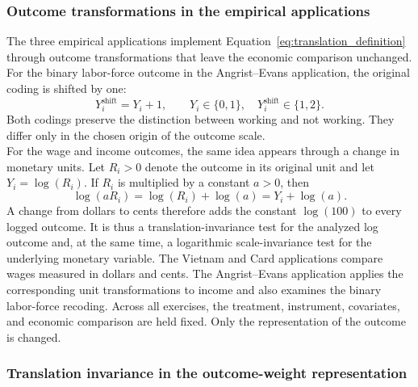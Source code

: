 \documentclass[12pt, a4paper, oneside]{article}
\theoremstyle{plain}
\theoremstyle{definition}
\begin{document}
\subsubsection{Outcome transformations in the empirical applications}
\label{subsubsec:translation_transformations}


The three empirical applications implement Equation~\eqref{eq:translation_definition}
through outcome transformations that leave the economic comparison unchanged.
For the binary labor-force outcome in the Angrist--Evans application, the original coding
is shifted by one:
\begin{equation}
    Y_i^{\mathrm{shift}}=Y_i+1,
    \qquad
    Y_i\in\{0,1\},
    \quad
    Y_i^{\mathrm{shift}}\in\{1,2\}.
    \label{eq:binary_translation}
\end{equation}
Both codings preserve the distinction between working and not working. They differ only
in the chosen origin of the outcome scale. \\
For the wage and income outcomes, the same idea appears through a change in monetary
units. Let \(R_i>0\) denote the outcome in its original unit and let
\(Y_i=\log(R_i)\). If \(R_i\) is multiplied by a constant \(a>0\), then
\begin{equation}
    \log(aR_i)
    =
    \log(R_i)+\log(a)
    =
    Y_i+\log(a).
    \label{eq:logged_outcome_translation}
\end{equation}
A change from dollars to cents therefore adds the constant \(\log(100)\) to every logged
outcome. It is thus a translation-invariance test for the analyzed log outcome and, at the
same time, a logarithmic scale-invariance test for the underlying monetary variable.
The Vietnam and Card applications compare wages measured in dollars and cents. The
Angrist--Evans application applies the corresponding unit transformations to income and
also examines the binary labor-force recoding. Across all exercises, the treatment,
instrument, covariates, and economic comparison are held fixed. Only the representation
of the outcome is changed.





\subsubsection{Translation invariance in the outcome-weight representation}
\label{subsubsec:translation_outcome_weights}
\end{document}

